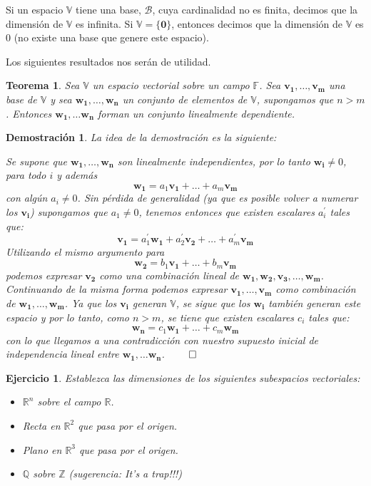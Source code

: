 \documentclass[11pt]{report}
\theoremstyle{break}
\newtheorem{teorema}{Teorema}[chapter]
\newtheorem*{demostracion}{Demostración}
\newtheorem{ejercicio}{Ejercicio}[chapter]
\theoremstyle{break}
\newcommand{\mbb}[1]{$\mathbb{#1}$}
\begin{document}
Si un espacio \mbb{V} tiene una base, $\mathcal{B}$, cuya cardinalidad no es finita, decimos que la dimensión de \mbb{V} es infinita.
Si $\mathbb{V} = \{ \bm{0} \}$, entonces decimos que la dimensión de \mbb{V} es $0$ (no existe una base que genere este espacio).

Los siguientes resultados nos serán de utilidad.

\begin{teorema}
\label{teorema:conjuntos-maximales}
Sea \mbb{V} un espacio vectorial sobre un campo \mbb{F}. Sea $\bm{v_1}, \ldots, \bm{v_m}$ una base de \mbb{V} y sea $\bm{w_1}, \ldots, \bm{w_n}$ un conjunto de elementos de \mbb{V}, supongamos que $n > m$. Entonces $\bm{w_1}, \ldots \bm{w_n}$ forman un conjunto linealmente dependiente.
\end{teorema}
\begin{demostracion}
La idea de la demostración es la siguiente:

Se supone que $\bm{w_1}, \ldots, \bm{w_n}$ son linealmente independientes, por lo tanto $\bm{w_i} \neq 0$, para todo $i$ y además 
$$\bm{w_1} = a_{1}\bm{v_1} + \ldots + a_{m}\bm{v_m}$$
con algún $a_i \neq 0$. Sin pérdida de generalidad (ya que es posible volver a numerar los $\bm{v_i}$) supongamos que $a_1 \neq 0$, tenemos entonces que existen escalares $a_{i}^{'}$ tales que:
$$\bm{v_1} = a_{1}^{'}\bm{w_1} + a_{2}^{'}\bm{v_2} + \ldots + a_{m}^{'} \bm{v_m}$$
Utilizando el mismo argumento para
$$\bm{w_2} = b_{1}\bm{v_1} + \ldots + b_{m}\bm{v_m}$$
podemos expresar $\bm{v_2}$ como una combinación lineal de $\bm{w_1}, \bm{w_2}, \bm{v_3}, \ldots, \bm{w_m}$. Continuando de la misma forma podemos expresar $\bm{v_1}, \ldots, \bm{v_m}$ como combinación de $\bm{w_1}, \ldots, \bm{w_m}$. Ya que los $\bm{v_i}$ generan \mbb{V}, se sigue que los $\bm{w_i}$ también generan este espacio y por lo tanto, como $n > m$, se tiene que existen escalares $c_i$ tales que:
$$\bm{w_n} = c_{1}\bm{w_1} + \ldots + c_{m}\bm{w_m}$$
con lo que llegamos a una contradicción con nuestro supuesto inicial de independencia lineal entre $\bm{w_1}, \ldots \bm{w_n}$. $\qed$
\end{demostracion}


\begin{ejercicio}
Establezca las dimensiones de los siguientes subespacios vectoriales:
\begin{itemize}[label=$\bullet$]
\item $\mathbb{R}^n$ sobre el campo $\mathbb{R}$.
\item Recta en $\mathbb{R}^2$ que pasa por el origen.
\item Plano en $\mathbb{R}^3$ que pasa por el origen.
\item \mbb{Q} sobre \mbb{Z} (sugerencia: It's a trap!!!)
\end{itemize}
\end{ejercicio}
\end{document}
